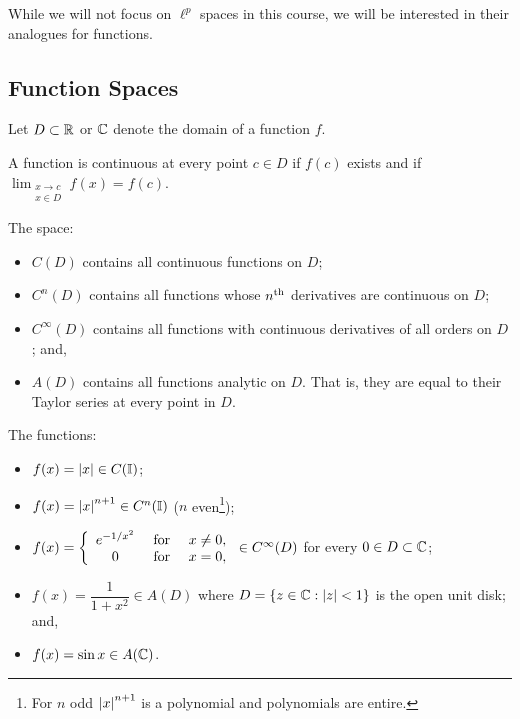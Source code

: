 While we will not focus on $\ell^p$ spaces in this course, we will be interested in their analogues for functions.

\subsection{Function Spaces}

Let $D\subset\mathbb{R}$ or $\mathbb{C}$ denote the domain of a function $f$. 

\begin{definition}
A function is continuous at every point $c\in D$ if $f(c)$ exists and if $\displaystyle\lim_{\substack{x\to c \\ x \in D}}f(x) = f(c)$. \end{definition}

\begin{definition} The space:
\begin{itemize}
\item $C(D)$ contains all continuous functions on $D$;
\item $C^n(D)$ contains all functions whose $n^{\rm th}$ derivatives are continuous on $D$;
\item $C^\infty(D)$ contains all functions with continuous derivatives of all orders on $D$; and,
\item $A(D)$ contains all functions analytic on $D$. That is, they are equal to their Taylor series at every point in $D$.
\end{itemize}
\end{definition}

\begin{example}
The functions:
\begin{itemize}
\item $f(x) = \left|{x}\right| \in C(\mathbb{I})$;
\item $f(x) = \left|{x}\right|^{n+1}\in C^n(\mathbb{I})$ ($n$ even\footnote{For $n$ odd $\left|{x}\right|^{n+1}$ is a polynomial and polynomials are entire.});
\item $f(x) = \left\{\begin{array}{ccc} e^{-1/x^2} & \hbox{ for } & x\ne 0,\\0 & \hbox{ for } & x = 0,\end{array}\right.\in C^\infty(D)$ for every $0\in D\subset\mathbb{C}$;
\item $f(x) = \dfrac{1}{1+x^2} \in A(D)$ where $D = \{z\in\mathbb{C}:\left|{z}\right|<1\}$ is the open unit disk; and,
\item $f(x) = \sin x\in A(\mathbb{C})$.
\end{itemize}
\end{example}

